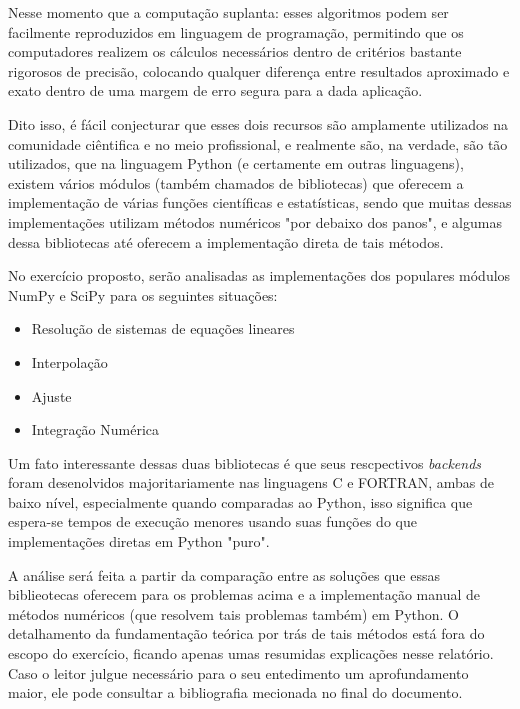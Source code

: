\documentclass[12pt,A4]{report}
\begin{document}
Nesse momento que a computação suplanta: esses algoritmos podem ser facilmente reproduzidos em linguagem de programação, permitindo que os computadores realizem os cálculos necessários dentro de critérios bastante rigorosos de precisão, colocando qualquer diferença entre resultados aproximado e exato dentro de uma margem de erro segura para a dada aplicação.

Dito isso, é fácil conjecturar que esses dois recursos são amplamente utilizados na comunidade ciêntifica e no meio profissional, e realmente são, na verdade, são tão utilizados, que na linguagem Python (e certamente em outras linguagens), existem vários módulos (também chamados de bibliotecas) que oferecem a implementação de várias funções científicas e estatísticas, sendo que muitas dessas implementações utilizam métodos numéricos "por debaixo dos panos", e algumas dessa bibliotecas até oferecem a implementação direta de tais métodos. 

No exercício proposto, serão analisadas as implementações dos populares módulos NumPy e SciPy para os seguintes situações:
\begin{itemize}
    \item Resolução de sistemas de equações lineares
    \item Interpolação
    \item Ajuste
    \item Integração Numérica
\end{itemize}
Um fato interessante dessas duas bibliotecas é que seus rescpectivos \textit{backends} foram desenolvidos majoritariamente nas linguagens C e FORTRAN, ambas de baixo nível, especialmente quando comparadas ao Python, isso significa que espera-se tempos de execução menores usando suas funções do que implementações diretas em Python "puro".

A análise será feita a partir da comparação entre as soluções que essas biblieotecas oferecem para os problemas acima e a implementação manual de métodos numéricos (que resolvem tais problemas também) em Python. O detalhamento da fundamentação teórica por trás de tais métodos está fora do escopo do exercício, ficando apenas umas resumidas explicações nesse relatório. Caso o leitor julgue necessário para o seu entedimento um aprofundamento maior, ele pode consultar a bibliografia mecionada no final do documento.


\newpage
\end{document}
